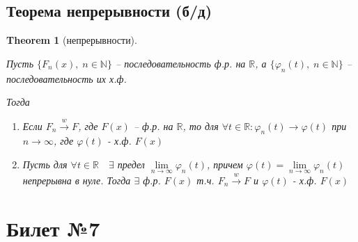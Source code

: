 \documentclass[a4paper]{article}
\theoremstyle{plain}
\newtheorem{theorem}{Theorem}
\theoremstyle{remark}
\theoremstyle{definition}
\newcommand{\setR}{\mathbb{R}}
\newcommand{\setN}{\mathbb{N}}
\newcommand{\toup}[1]{\xrightarrow{#1}}
\renewcommand{\phi}{\varphi}
\begin{document}
\subsection{Теорема непрерывности (б/д)}
\begin{theorem}[непрерывности]~

  Пусть $\{ F_n(x),\; n \in \setN \}$ -- последовательность ф.р. на $\setR$, 
  а $\{ \phi_n(t),\; n \in \setN \}$ -- последовательность их х.ф.

  Тогда
  \begin{enumerate}
    \item
      Если $F_n \toup{w} F$, где $F(x)$ -- ф.р. на $\setR$, 
      то для $\forall t \in \setR: \phi_n(t) \to \phi(t)$ при $n \to \infty$, 
      где $\phi(t)$ - х.ф. $F(x)$

    \item
      Пусть для $\forall t \in \setR \quad \exists$ предел $\lim\limits_{n \to \infty} \phi_n (t)$,
      причем $\phi(t) = \lim\limits_{n \to \infty} \phi_n(t)$ непрерывна в нуле. 
      Тогда $\exists$ ф.р. $F(x)$ т.ч. $F_n \toup{w} F$ и $\phi(t)$ - х.ф. $F(x)$
  \end{enumerate}
 \end{theorem}
\newpage
\section{Билет №7}
\end{document}

